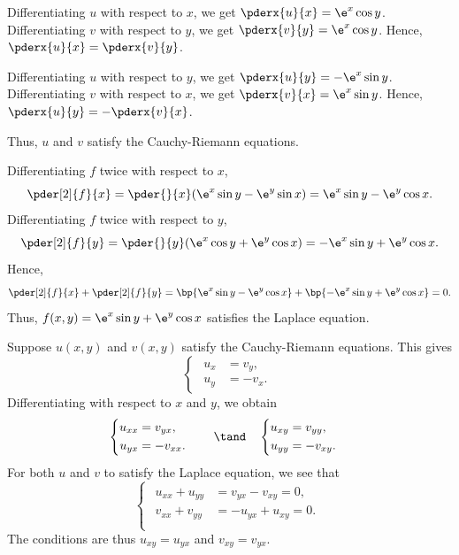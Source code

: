 \begin{solution}
    \begin{ppart}
        Differentiating $u$ with respect to $x$, we get $\pderx{u}{x} = \e^x \cos y$. Differentiating $v$ with respect to $y$, we get $\pderx{v}{y} = \e^x \cos y$. Hence, $\pderx{u}{x} = \pderx{v}{y}$.

        Differentiating $u$ with respect to $y$, we get $\pderx{u}{y} = -\e^x \sin y$. Differentiating $v$ with respect to $x$, we get $\pderx{v}{x} = \e^x \sin y$. Hence, $\pderx{u}{y} = -\pderx{v}{x}$.
        
        Thus, $u$ and $v$ satisfy the Cauchy-Riemann equations.
    \end{ppart}
    \begin{ppart}
        Differentiating $f$ twice with respect to $x$, \[\pder[2]{f}{x} = \pder{}{x} (\e^x \sin y - \e^y \sin x) = \e^x \sin y - \e^y \cos x.\] Differentiating $f$ twice with respect to $y$, \[\pder[2]{f}{y} = \pder{}{y} (\e^x \cos y + \e^y \cos x) = -\e^x \sin y + \e^y \cos x.\] Hence,\[\pder[2]{f}{x} + \pder[2]{f}{y} = \bp{\e^x \sin y - \e^y \cos x} + \bp{-\e^x \sin y + \e^y \cos x} = 0.\] Thus, $f(x, y) = \e^x \sin y + \e^y \cos x$ satisfies the Laplace equation.
    \end{ppart}
    \begin{ppart}
        Suppose $u(x, y)$ and $v(x, y)$ satisfy the Cauchy-Riemann equations. This gives
        \[\begin{cases}
            \begin{aligned}
                u_x &= v_y,\\
                u_y &= -v_x.
            \end{aligned}
        \end{cases}
        \]
        Differentiating with respect to $x$ and $y$, we obtain
        \[\begin{cases}
            \begin{aligned}
                u_{xx} &= v_{yx},\\
                u_{yx} &= -v_{xx}.
            \end{aligned}
        \end{cases} \quad \tand \quad \begin{cases}
            \begin{aligned}
                u_{xy} &= v_{yy},\\
                u_{yy} &= -v_{xy}.
            \end{aligned}
        \end{cases}\] For both $u$ and $v$ to satisfy the Laplace equation, we see that
        \[\begin{cases}
            \begin{aligned}
                u_{xx} + u_{yy} &= v_{yx} - v_{xy} = 0,\\
                v_{xx} + v_{yy} &= -u_{yx} + u_{xy} = 0.\\
            \end{aligned}
        \end{cases}
        \]
        The conditions are thus $u_{xy} = u_{yx}$ and $v_{xy} = v_{yx}$.
    \end{ppart}
\end{solution}

